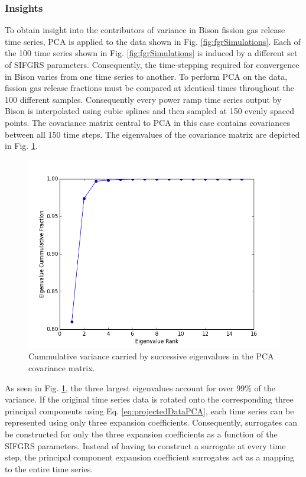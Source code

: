 \subsubsection{Insights}

To obtain insight into the contributors of variance in Bison fission gas release time series, \ac{PCA} is applied to the data shown in Fig. \ref{fig:fgrSimulations}. Each of the 100 time series shown in Fig. \ref{fig:fgrSimulations} is induced by a different set of \ac{SIFGRS} parameters. Consequently, the time-stepping required for convergence in Bison varies from one time series to another. To perform \ac{PCA} on the data, fission gas release fractions must be compared at identical times throughout the 100 different samples. Consequently every power ramp time series output by Bison is interpolated using cubic splines and then sampled at 150 evenly spaced points. The covariance matrix central to \ac{PCA} in this case contains covariances between all 150 time steps. The eigenvalues of the covariance matrix are depicted in Fig. \ref{fig:fgrEvals}.
\begin{figure}
\caption{\label{fig:fgrEvals}
Cummulative variance carried by successive eigenvalues in the \ac{PCA} covariance matrix.}
 \begin{center}
  \includegraphics[scale=.75]{./Chapter4/fgr_evals.png}
 \end{center}
\end{figure}
As seen in Fig. \ref{fig:fgrEvals}, the three largest eigenvalues account for over 99\% of the variance. If the original time series data is rotated onto the corresponding three principal components using Eq. \ref{eq:projectedDataPCA}, each time series can be represented using only three expansion coefficients. Consequently, surrogates can be constructed for only the three expansion coefficients as a function of the \ac{SIFGRS} parameters. Instead of having to construct a surrogate at every time step, the principal component expansion coefficient surrogates act as a mapping to the entire time series.   

